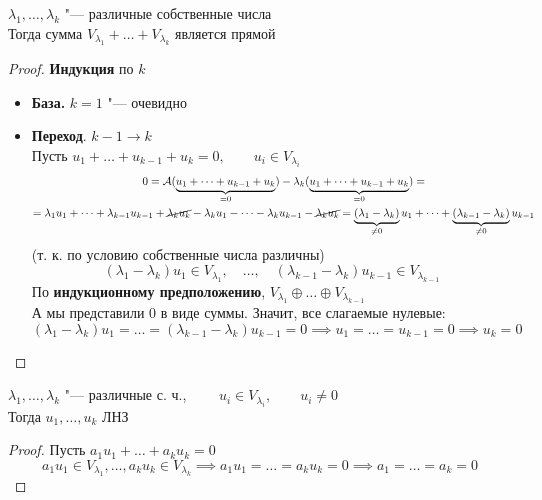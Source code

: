\begin{theorem}
	$ \lambda_1, \dots, \lambda_k $ "--- различные собственные числа \\
	Тогда сумма $ V_{\lambda_1} + \dots + V_{\lambda_k} $ является прямой
\end{theorem}

\begin{proof}
	\textbf{Индукция} по $ k $
	\begin{itemize}
		\item \textbf{База.} $ k = 1 $ "--- очевидно
		\item \textbf{Переход}. $ k - 1 \to k $ \\
		Пусть $ u_1 + \dots + u_{k - 1} + u_k = 0, \qquad u_i \in V_{\lambda_i} $
		\begin{multline*}
			0 = \mathcal{A}(\underbrace{u_1 + \dots + u_{k - 1} + u_k}_{= 0 }) - \lambda_k(\underbrace{u_1 + \dots + u_{k - 1} + u_k}_{= 0 }) = \\
			= \lambda_1u_1 + \dots + \lambda_{k - 1}u_{k - 1} + \cancel{\lambda_ku_k} - \lambda_ku_1 - \dots - \lambda_ku_{k - 1} - \cancel{\lambda_ku_k} = \underbrace{(\lambda_1 - \lambda_k)}_{\ne 0}u_1 + \dots + \underbrace{(\lambda_{k - 1} - \lambda_k)}_{\ne 0}u_{k - 1}
		\end{multline*}
		(т. к. по условию собственные числа различны)
		$$ (\lambda_1 - \lambda_k)u_1 \in V_{\lambda_1}, \quad \dots, \quad (\lambda_{k - 1} - \lambda_k)u_{k - 1} \in V_{\lambda_{k - 1}} $$
		По \textbf{индукционному предположению}, $ V_{\lambda_1} \oplus \dots \oplus V_{\lambda_{k - 1}} $ \\
		А мы представили 0 в виде суммы. Значит, все слагаемые нулевые:
		$$ (\lambda_1 - \lambda_k)u_1 = \dots = (\lambda_{k - 1} - \lambda_k)u_{k - 1} = 0 \implies u_1 = \dots = u_{k - 1} = 0 \implies u_k = 0 $$
	\end{itemize}
\end{proof}

\begin{implication}
	$ \lambda_1, \dots, \lambda_k $ "--- различные с. ч., $ \qquad u_i \in V_{\lambda_i}, \qquad u_i \ne 0 $ \\
	Тогда $ u_1, \dots, u_k $ ЛНЗ
\end{implication}

\begin{proof}
	Пусть $ a_1u_1 + \dots + a_ku_k = 0 $
	$$ a_1u_1 \in V_{\lambda_1}, \dots, a_ku_k \in V_{\lambda_k} \implies a_1u_1 = \dots = a_ku_k = 0 \implies a_1 = \dots = a_k = 0 $$
\end{proof}

